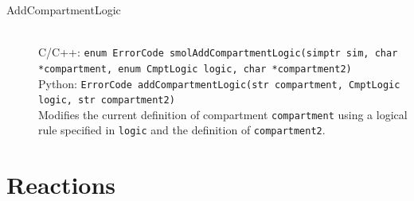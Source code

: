 \documentclass {book}
\newcommand {\ttt} {\texttt}
\begin{document}
\begin{description}
\item[AddCompartmentLogic]
\hfill \\
C/C++: \ttt{enum ErrorCode smolAddCompartmentLogic(simptr sim, char *compartment, enum CmptLogic logic, char *compartment2)}\\
Python: \ttt{ErrorCode addCompartmentLogic(str compartment, CmptLogic logic, str compartment2)}\\
Modifies the current definition of compartment \ttt{compartment} using a logical rule specified in \ttt{logic} and the definition of \ttt{compartment2}.

\end{description}

\section{Reactions}
\end{document}
